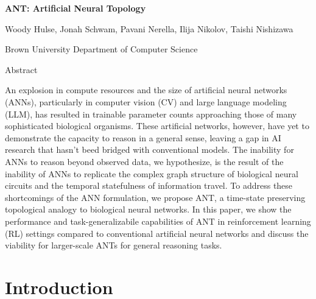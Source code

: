 \documentclass{article}
\begin{document}
	
	\vspace{25pt}
	
	\begin{center}
		{\Large \bf 
			ANT: Artificial Neural Topology
		}	
		\vspace{25pt}
	
		{\large 
			Woody Hulse, Jonah Schwam, Pavani Nerella, Ilija Nikolov, Taishi Nishizawa 
		}
		
		\vspace{5pt}
		
		Brown University Department of Computer Science
	\end{center}
	
	\vspace{25pt}
	
\begin{multicols}{2}
	{\bf
	\begin{center}
		Abstract	
	\end{center}
	\vspace{5pt}
	
	
	An explosion in compute resources and the size of artificial neural networks (ANNs), particularly in computer vision (CV) and large language modeling (LLM), has resulted in trainable parameter counts approaching those of many sophisticated biological organisms. These artificial networks, however, have yet to demonstrate the capacity to reason in a general sense, leaving a gap in AI research that hasn't beed bridged with conventional models. The inability for ANNs to reason beyond observed data, we hypothesize, is the result of the inability of ANNs to replicate the complex graph structure of biological neural circuits and the temporal statefulness of information travel. To address these shortcomings of the ANN formulation, we propose ANT, a time-state preserving topological analogy to biological neural networks. In this paper, we show the performance and task-generalizabile capabilities of ANT in reinforcement learning (RL) settings compared to conventional artificial neural networks and discuss the viability for larger-scale ANTs for general reasoning tasks.
	}
	
	\vspace{15pt}
	
	\section{Introduction}
	

\end{multicols}
\end{document}
